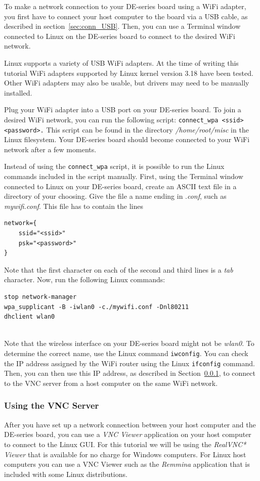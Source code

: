 \documentclass[11pt, twoside, pdftex]{article}
\begin{document}
To make a network connection to your DE-series board using a WiFi adapter, you first have to 
connect your host computer to the board via a USB cable, as described in 
section~\ref{sec:conn_USB}. Then, you can use a Terminal window connected to Linux on 
the DE-series board to connect to the desired WiFi network. 

Linux supports a variety of USB WiFi adapters. At the time of writing this
tutorial WiFi adapters supported by Linux kernel version 3.18 have been tested. Other WiFi
adapters may also be usable, but drivers may need to be manually installed.

Plug your WiFi adapter into a USB port on your DE-series board. To join a desired WiFi network, 
you can run the following script: \texttt{connect\_wpa <ssid> <password>.} This script can be found 
in the directory {\it /home/root/misc} in the Linux filesystem. Your DE-series board should 
become connected to your WiFi network after a few moments.

Instead of using the \texttt{connect\_wpa} script, it is possible to run the Linux commands
included in the script manually. First, using the Terminal window connected to Linux on
your DE-series board, create an ASCII text file in a directory of your choosing. Give the file 
a name ending in .{\it conf}, such as {\it mywifi.conf}. This file has to contain the lines

\begin{lstlisting}
network={
	ssid="<ssid>"
	psk="<password>"
}
\end{lstlisting}

Note that the first character on each of the second and third lines is a {\it tab} character.
Now, run the following Linux commands:

\begin{lstlisting}
stop network-manager
wpa_supplicant -B -iwlan0 -c./mywifi.conf -Dnl80211
dhclient wlan0
\end{lstlisting}

~\\
Note that the wireless interface on your DE-series board might not be {\it wlan0}. To
determine the correct name, use the Linux command \texttt{iwconfig}. You can check the IP address 
assigned by the WiFi router using the Linux \texttt{ifconfig} command. Then, you can then use 
this IP address, as described in Section~\ref{sec:VNC}, to connect to the VNC server from a 
host computer on the same WiFi network.

\subsubsection{Using the VNC Server}
\label{sec:VNC}
After you have set up a network connection between your host computer and the DE-series
board, you can use a {\it VNC Viewer} application on your host computer to connect to 
the Linux GUI. For this tutorial we will be using the {\it RealVNC* Viewer} that is available 
for no charge for Windows computers. For Linux host computers you can
use a VNC Viewer such as the {\it Remmina} application that is included with some Linux
distributions.
\end{document}
